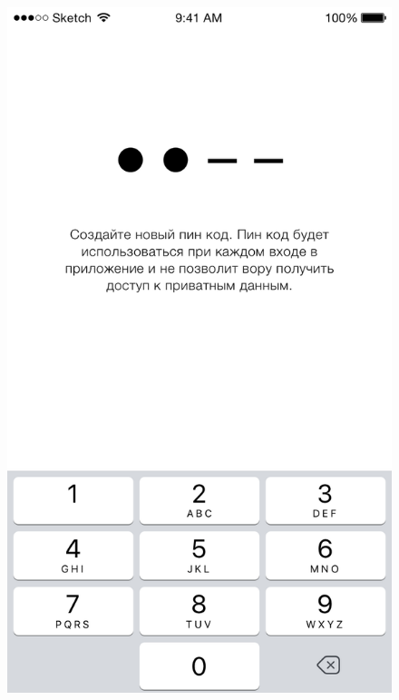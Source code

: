 \begin{figure}[h]
\centering
\begin{minipage}{.33\textwidth}
  \centering
  \includegraphics[height=0.25\textheight]{inc/img/ui/pin_code_create.png}
  \label{sec:usage:pin:create}
\end{minipage}%
\begin{minipage}{.33\textwidth}
  \centering

\end{minipage}
\end{figure}
